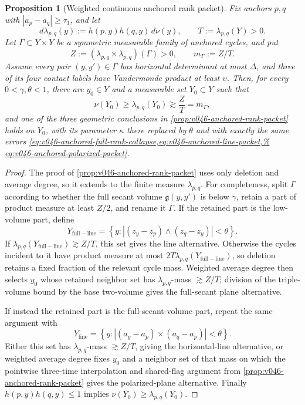 \documentclass[10pt]{article}
\newtheorem{proposition}[theorem]{Proposition}
\begin{document}
\begin{proposition}[Weighted continuous anchored rank packet]
\label{prop:v050-continuous-anchored-rank-packet}
Fix anchors \(p,q\) with \(|a_p-a_q|\ge\tau_1\), and let
\begin{equation}
\label{eq:v050-common-neighbor-measure}
d\lambda_{p,q}(y)
:=
h(p,y)h(q,y)\,d\nu(y),
\qquad
T:=\lambda_{p,q}(Y)>0.
\end{equation}
Let \(\Gamma\subset Y\times Y\) be a symmetric measurable family of anchored cycles, and put
\[
Z:=(\lambda_{p,q}\times\lambda_{p,q})(\Gamma)>0,
\qquad
m_\Gamma:=Z/T.
\]
Assume every pair \((y,y')\in\Gamma\) has horizontal determinant at most \(\Delta\), and three of
its four contact labels have Vandermonde product at least \(\upsilon\).  Then, for every
\(0<\gamma,\theta<1\), there are \(y_0\in Y\) and a measurable set \(Y_0\subset Y\) such that
\begin{equation}
\label{eq:v050-continuous-packet-mass}
\boxed{
\nu(Y_0)
\ge
\lambda_{p,q}(Y_0)
\gtrsim
\frac ZT
=
m_\Gamma,
}
\end{equation}
and one of the three geometric conclusions in
\cref{prop:v046-anchored-rank-packet} holds on \(Y_0\), with its parameter \(\kappa\) there replaced
by \(\theta\) and with exactly the same errors
\cref{eq:v046-anchored-full-rank-collapse,eq:v046-anchored-line-packet,%
eq:v046-anchored-polarized-packet}.
\end{proposition}

\begin{proof}
The proof of \cref{prop:v046-anchored-rank-packet} uses only deletion and average degree, so it
extends to the finite measure \(\lambda_{p,q}\).  For completeness, split \(\Gamma\) according to
whether the full secant volume \(\mathfrak g(y,y')\) is below \(\gamma\), retain a part of product
measure at least \(Z/2\), and rename it \(\Gamma\).  If the retained part is the low-volume part,
define
\[
Y_{\mathrm{full-line}}
=
\left\{
y:
|(z_y-z_p)\wedge(z_q-z_y)|<\theta
\right\}.
\]
If \(\lambda_{p,q}(Y_{\mathrm{full-line}})\gtrsim Z/T\), this set gives the line alternative.
Otherwise the cycles incident to it have product measure at most
\(2T\lambda_{p,q}(Y_{\mathrm{full-line}})\), so deletion retains a fixed fraction of the relevant
cycle mass.  Weighted average degree then selects \(y_0\) whose retained neighbor set has
\(\lambda_{p,q}\)-mass \(\gtrsim Z/T\); division of the triple-volume bound by the base two-volume
gives the full-secant plane alternative.

If instead the retained part is the full-secant-volume part, repeat the same argument with
\[
Y_{\mathrm{line}}
=
\left\{
y:
|(a_y-a_p)\times(a_q-a_p)|<\theta
\right\}.
\]
Either this set has \(\lambda_{p,q}\)-mass \(\gtrsim Z/T\), giving the horizontal-line alternative,
or weighted average degree fixes \(y_0\) and a neighbor set of that mass on which the pointwise
three-time interpolation and shared-flag argument from
\cref{prop:v046-anchored-rank-packet} gives the polarized-plane alternative.  Finally
\(h(p,y)h(q,y)\le1\) implies \(\nu(Y_0)\ge\lambda_{p,q}(Y_0)\).
\end{proof}
\end{document}
